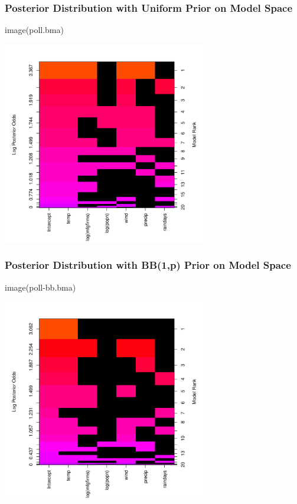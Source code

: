 \documentclass[]{beamer}
\begin{document}
\begin{frame}\frametitle{Posterior Distribution  with Uniform Prior on Model Space}
image(poll.bma)

\centering
\includegraphics[height=3.5in]{poll-image}  
\end{frame}

\begin{frame}\frametitle{Posterior Distribution  with BB(1,p) Prior on Model Space}
image(poll-bb.bma)

\centering
\includegraphics[height=3.5in]{poll-bb-image}  
\end{frame}
\end{document}
